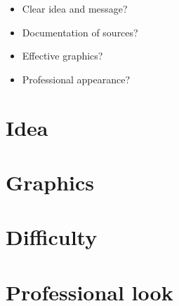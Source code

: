 \documentclass[11pt]{article}
\begin{document}
\begin{itemize} %
\item Clear idea and message?
\item Documentation of sources?
\item Effective graphics?
\item Professional appearance?
\end{itemize}
\bigskip

\section*{Idea}

\vspace*{0.75in}


\section*{Graphics}

\vspace*{0.75in}


\section*{Difficulty}

\vspace*{0.75in}


\section*{Professional look}

\vspace*{0.75in}

\end{document}
